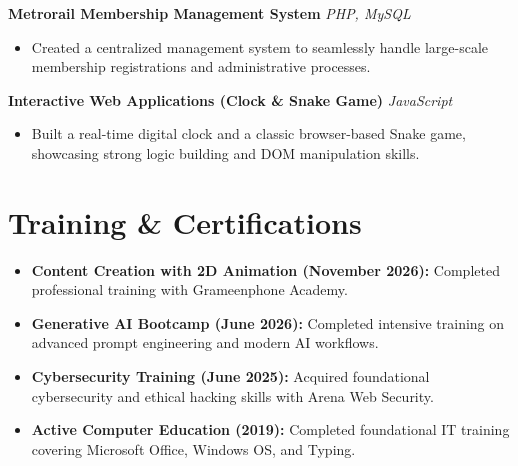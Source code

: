 \documentclass[11pt,letterpaper]{article}
\begin{document}
\vspace{4pt}
\noindent \textbf{Metrorail Membership Management System} \hfill \textit{PHP, MySQL} 
\begin{itemize}
    \item Created a centralized management system to seamlessly handle large-scale membership registrations and administrative processes.
\end{itemize}

\vspace{4pt}
\noindent \textbf{Interactive Web Applications (Clock \& Snake Game)} \hfill \textit{JavaScript} 
\begin{itemize}
    \item Built a real-time digital clock and a classic browser-based Snake game, showcasing strong logic building and DOM manipulation skills.
\end{itemize}

\section*{Training \& Certifications}
\begin{itemize}
    \item \textbf{Content Creation with 2D Animation (November 2026):} Completed professional training with Grameenphone Academy.
    \item \textbf{Generative AI Bootcamp (June 2026):} Completed intensive training on advanced prompt engineering and modern AI workflows.
    \item \textbf{Cybersecurity Training (June 2025):} Acquired foundational cybersecurity and ethical hacking skills with Arena Web Security.
    \item \textbf{Active Computer Education (2019):} Completed foundational IT training covering Microsoft Office, Windows OS, and Typing.
\end{itemize}
\end{document}
